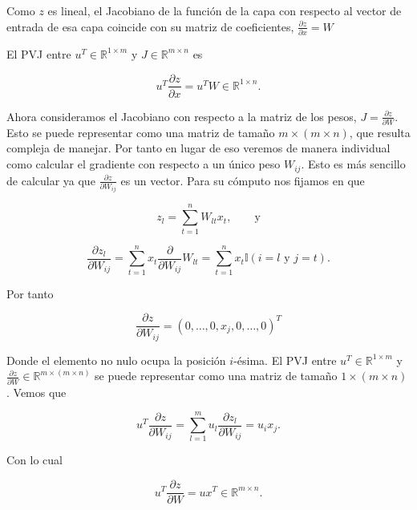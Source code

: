 Como $z$ es lineal, el Jacobiano de la función de la capa con respecto al vector de entrada de esa capa coincide con su matriz de coeficientes, $\frac{\partial z}{\partial x}=W$






El PVJ entre $u^T \in \mathbb{R}^{1 \times m}$ y $J \in \mathbb{R}^{m \times n}$ es

$$u^T \frac{\partial z}{\partial x} = u^T W \in \mathbb{R}^{1 \times n}.$$

Ahora consideramos el Jacobiano con respecto a la matriz de los pesos, $J=\frac{\partial z}{\partial W}$. Esto se puede representar como una matriz de tamaño $m \times (m \times n)$, que resulta compleja de manejar. Por tanto en lugar de eso veremos de manera individual como calcular el gradiente con respecto a un único peso $W_{ij}$. Esto es más sencillo de calcular ya que $\frac{\partial z}{\partial W_{ij}}$ es un vector. Para su cómputo nos fijamos en que 

$$z_l = \sum_{t=1}^n W_{lt}x_t, \qquad \textrm{y}$$

$$\frac{\partial z_l}{\partial W_{ij}} = \sum_{t=1}^n x_t \frac{\partial}{\partial W_{ij}} W_{lt} = \sum_{t=1}^n x_t \mathbb{I}(i=l \textrm{ y } j=t) .$$

Por tanto

$$\frac{\partial z}{\partial W_{ij}} = \left ( 0, \ldots, 0, x_j,  0, \ldots, 0 \right )^T$$

Donde el elemento no nulo ocupa la posición $i$-ésima. El PVJ entre $u^T \in \mathbb{R}^{1 \times m}$ y $\frac{\partial z}{\partial W} \in \mathbb{R}^{m \times ( m \times n)}$ se puede representar como una matriz de tamaño $1 \times (m \times n)$. Vemos que 

$$u^T \frac{\partial z}{\partial W_{ij}}= \sum_{l=1}^m u_l \frac{\partial z_l}{\partial W_{ij}} = u_i x_j.$$

Con lo cual

$$ u^T \frac{\partial z}{\partial W}  = ux^T \in \mathbb{R}^{m \times n}.$$



